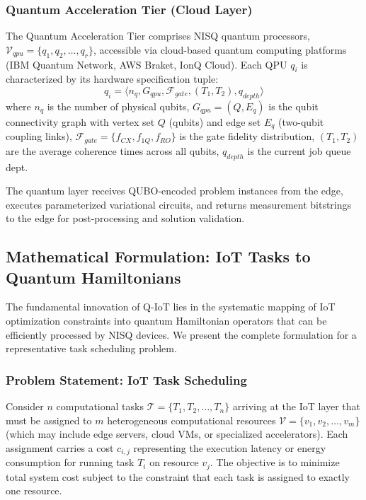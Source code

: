 \documentclass[lettersize,journal]{IEEEtran}
\begin{document}
\subsubsection{Quantum Acceleration Tier (Cloud Layer)}

The Quantum Acceleration Tier comprises NISQ quantum processors, $\mathcal{V}_{qpu} = \{q_1, q_2, \ldots, q_r\}$, accessible via cloud-based quantum computing platforms (IBM Quantum Network, AWS Braket, IonQ Cloud). Each QPU $q_i$ is characterized by its hardware specification tuple:
\begin{equation}
q_i = \langle n_q, G_{qpu}, \mathcal{F}_{gate}, (T_1, T_2), q_{depth} \rangle
\label{eq:qpu_spec}
\end{equation}
where $n_q$ is the number of physical qubits, $G_{qpu} = (Q, E_q)$ is the qubit connectivity graph with vertex set $Q$ (qubits) and edge set $E_q$ (two-qubit coupling links), $\mathcal{F}_{gate} = \{f_{CX}, f_{1Q}, f_{RO}\}$ is the gate fidelity distribution, $(T_1, T_2)$ are the average coherence times across all qubits, $q_{depth}$ is the current job queue dept.

The quantum layer receives QUBO-encoded problem instances from the edge, executes parameterized variational circuits, and returns measurement bitstrings to the edge for post-processing and solution validation.

\subsection{Mathematical Formulation: IoT Tasks to Quantum Hamiltonians}
\label{subsec:math_formulation}

The fundamental innovation of Q-IoT lies in the systematic mapping of IoT optimization constraints into quantum Hamiltonian operators that can be efficiently processed by NISQ devices. We present the complete formulation for a representative task scheduling problem.

\subsubsection{Problem Statement: IoT Task Scheduling}

Consider $n$ computational tasks $\mathcal{T} = \{T_1, T_2, \ldots, T_n\}$ arriving at the IoT layer that must be assigned to $m$ heterogeneous computational resources $\mathcal{V} = \{v_1, v_2, \ldots, v_m\}$ (which may include edge servers, cloud VMs, or specialized accelerators). Each assignment carries a cost $c_{i,j}$ representing the execution latency or energy consumption for running task $T_i$ on resource $v_j$. The objective is to minimize total system cost subject to the constraint that each task is assigned to exactly one resource.
\end{document}
